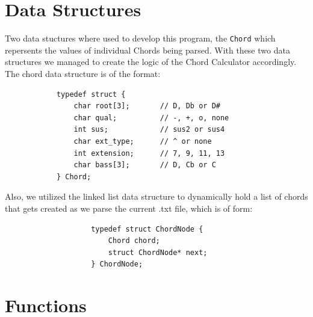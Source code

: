\documentclass{article}
\begin{document}
\section{Data Structures}
Two data stuctures where used to develop this program, the \texttt{Chord} which repersents the values of individual Chords being parsed. With these two data structures we managed to create the logic of the Chord Calculator accordingly. The chord data structure is of the format:
\begin{lstlisting}
            typedef struct {
                char root[3];       // D, Db or D#
                char qual;          // -, +, o, none 
                int sus;            // sus2 or sus4
                char ext_type;      // ^ or none 
                int extension;      // 7, 9, 11, 13
                char bass[3];       // D, Cb or C
            } Chord;
\end{lstlisting}
Also, we utilized the linked list data structure to dynamically hold a list of chords that gets created as we parse the current .txt file, which is of form:
\begin{lstlisting}
                    typedef struct ChordNode {
                        Chord chord;
                        struct ChordNode* next;
                    } ChordNode;
\end{lstlisting}
\section{Functions} \label{fig:Functions}
\end{document}
